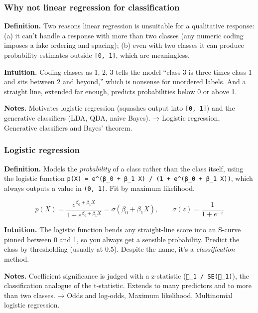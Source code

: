 \documentclass[
  10pt,
  letterpaper,
  onecolumn]{article}
\begin{document}
\hypertarget{why-not-linear-regression-for-classification}{%
\subsubsection{Why not linear regression for
classification}\label{why-not-linear-regression-for-classification}}

\textbf{Definition.} Two reasons linear regression is unsuitable for a
qualitative response: (a) it can't handle a response with more than two
classes (any numeric coding imposes a fake ordering and spacing); (b)
even with two classes it can produce probability estimates outside
\texttt{{[}0,\ 1{]}}, which are meaningless.

\textbf{Intuition.} Coding classes as 1, 2, 3 tells the model ``class 3
is three times class 1 and sits between 2 and beyond,'' which is
nonsense for unordered labels. And a straight line, extended far enough,
predicts probabilities below 0 or above 1.

\textbf{Notes.} Motivates logistic regression (squashes output into
\texttt{{[}0,\ 1{]}}) and the generative classifiers (LDA, QDA, naive
Bayes). → Logistic regression, Generative classifiers and Bayes'
theorem.

\hypertarget{logistic-regression}{%
\subsubsection{Logistic regression}\label{logistic-regression}}

\textbf{Definition.} Models the \emph{probability} of a class rather
than the class itself, using the logistic function
\texttt{p(X)\ =\ e\^{}(β\_0\ +\ β\_1\ X)\ /\ (1\ +\ e\^{}(β\_0\ +\ β\_1\ X))},
which always outputs a value in \texttt{(0,\ 1)}. Fit by maximum
likelihood.

\begin{equation*}
p(X)=\frac{e^{\beta_0+\beta_1X}}{1+e^{\beta_0+\beta_1X}}=\sigma(\beta_0+\beta_1X),
\qquad
\sigma(z)=\frac{1}{1+e^{-z}}
\end{equation*}

\textbf{Intuition.} The logistic function bends any straight-line score
into an S-curve pinned between 0 and 1, so you always get a sensible
probability. Predict the class by thresholding (usually at 0.5). Despite
the name, it's a \emph{classification} method.

\textbf{Notes.} Coefficient significance is judged with a z-statistic
(\texttt{\_1\ /\ SE(\_1)}), the classification analogue of the
t-statistic. Extends to many predictors and to more than two classes. →
Odds and log-odds, Maximum likelihood, Multinomial logistic regression.
\end{document}
